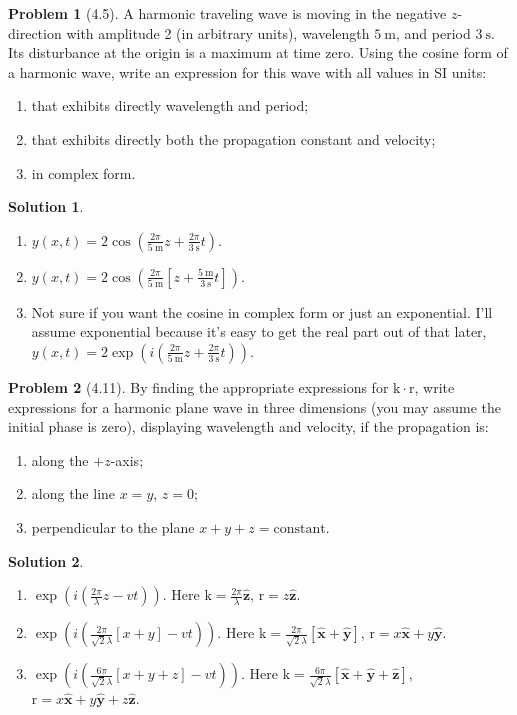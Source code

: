 \documentclass[10pt]{article}
\theoremstyle{definition}
\newtheorem{problem}{Problem}
\newtheorem{soln}{Solution}
\newcommand{\ux}{\hat{\mathbf{x}}}
\newcommand{\uy}{\hat{\mathbf{y}}}
\newcommand{\uz}{\hat{\mathbf{z}}}
\newcommand{\bv}[1]{\bm{\mathrm{#1}}}
\begin{document}
\begin{problem}[4.5]
A harmonic traveling wave is moving in the negative $z$-direction with amplitude 2 (in arbitrary units), wavelength $\qty{5}{\meter}$, and period $\qty{3}{\second}$.
Its disturbance at the origin is a maximum at time zero. Using the cosine form of a harmonic wave, write an expression for this wave with all values in SI units:
\begin{enumerate}[label=(\alph*)]
  \item that exhibits directly wavelength and period;
  \item that exhibits directly both the propagation constant and velocity;
  \item in complex form.
\end{enumerate}
\end{problem}
\begin{soln}
  \begin{enumerate}[label=(\alph*)]
    \item $y(x,t)=2\cos(\frac{2\pi}{\qty{5}{\meter}}z+\frac{2\pi}{\qty{3}{\second}}t)$.
    \item $y(x,t)=2\cos(\frac{2\pi}{\qty{5}{\meter}}\left[z+\frac{\qty{5}{\meter}}{\qty{3}{\second}}t\right])$.
    \item Not sure if you want the cosine in complex form or just an exponential. I'll assume exponential because it's easy to get the real part out of that later,
          $y(x,t)=2\exp(i(\frac{2\pi}{\qty{5}{\meter}}z+\frac{2\pi}{\qty{3}{\second}}t))$.
  \end{enumerate}
\end{soln}

\begin{problem}[4.11]
By finding the appropriate expressions for $\bv{k}\cdot\bv{r}$, write expressions for a harmonic plane wave in three dimensions (you may assume the initial phase is zero),
displaying wavelength and velocity, if the propagation is:
\begin{enumerate}[label=(\alph*)]
  \item along the $+z$-axis;
  \item along the line $x=y$, $z=0$;
  \item perpendicular to the plane $x+y+z=\mathrm{constant}$.
\end{enumerate}
\end{problem}
\begin{soln}
  \begin{enumerate}[label=(\alph*)]
    \item $\exp(i(\frac{2\pi}{\lambda}z-vt))$. Here $\bv{k}=\frac{2\pi}{\lambda}\uz$, $\bv{r}=z\uz$.
    \item $\exp(i(\frac{2\pi}{\sqrt{2}\lambda}\left[x+y\right]-vt))$. Here $\bv{k}=\frac{2\pi}{\sqrt{2}\lambda}\left[\ux+\uy\right]$, $\bv{r}=x\ux+y\uy$.
    \item $\exp(i(\frac{6\pi}{\sqrt{2}\lambda}\left[x+y+z\right]-vt))$. Here $\bv{k}=\frac{6\pi}{\sqrt{2}\lambda}\left[\ux+\uy+\uz\right]$, $\bv{r}=x\ux+y\uy+z\uz$.
  \end{enumerate}
\end{soln}
\end{document}
